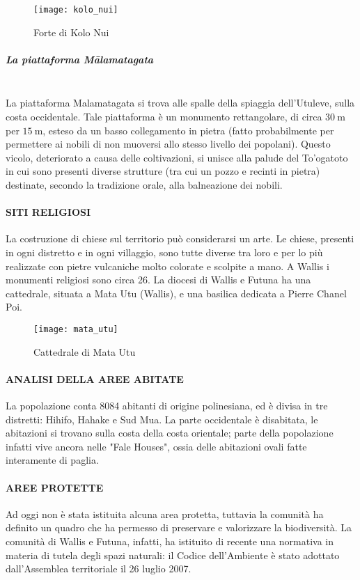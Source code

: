 \documentclass[fleqn,11pt]{SelfArx} %
\begin{document}
\begin{figure}[ht]\centering
	\texttt{[image: kolo\_nui]}
	\caption{Forte di Kolo Nui}
\end{figure}

\subparagraph{La piattaforma Mālamatagata} \phantom{a} \\
La piattaforma Malamatagata si trova alle spalle della spiaggia dell'Utuleve, sulla costa occidentale.
Tale piattaforma è un monumento rettangolare, di circa \(\SI{30}{\m}\) per \(\SI{15}{\m}\), esteso da un basso collegamento in pietra (fatto probabilmente per permettere ai nobili di non muoversi allo stesso livello dei popolani).
Questo vicolo, deteriorato a causa delle coltivazioni, si unisce alla palude del To'ogatoto in cui sono presenti diverse strutture (tra cui un pozzo e recinti in pietra) destinate, secondo la tradizione orale, alla balneazione dei nobili.

\paragraph{SITI RELIGIOSI}
La costruzione di chiese sul territorio può considerarsi un arte. Le chiese, presenti in ogni distretto e in ogni villaggio, sono tutte diverse tra loro e per lo più realizzate con pietre vulcaniche molto colorate e scolpite a mano.
A Wallis i monumenti religiosi sono circa 26. 
La diocesi di Wallis e Futuna ha una cattedrale, situata a Mata Utu (Wallis), e una basilica dedicata a Pierre Chanel Poi.

\begin{figure}[ht]\centering
	\texttt{[image: mata\_utu]}
	\caption{Cattedrale di Mata Utu}
\end{figure}

\paragraph{ANALISI DELLA AREE ABITATE}
La popolazione conta 8084 abitanti di origine polinesiana, ed è divisa in tre distretti: Hihifo, Hahake e Sud Mua.
La parte occidentale è disabitata, le abitazioni si trovano sulla costa della costa orientale; parte della popolazione infatti vive ancora nelle "Fale Houses", ossia delle abitazioni ovali fatte interamente di paglia.

\paragraph{AREE PROTETTE}
Ad oggi non è stata istituita alcuna area protetta, tuttavia la comunità ha definito un quadro che ha permesso di preservare e valorizzare la biodiversità.
La comunità di Wallis e Futuna, infatti, ha istituito di recente una normativa in materia di tutela degli spazi naturali: il Codice dell'Ambiente è stato adottato dall'Assemblea territoriale il 26 luglio 2007.
\end{document}
